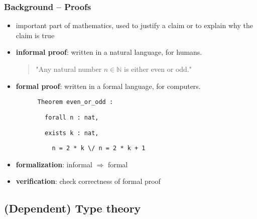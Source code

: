 \documentclass[slides]{beamer}
\begin{document}
\begin{frame}[fragile]
    \frametitle{Background – Proofs}

    \begin{itemize}
        \item important part of mathematics, used to justify a claim or to explain why the claim is true
        \item
            \textbf{informal proof}: written in a natural language, for humans.
            \begin{quote}
              "Any natural number $n \in \mathbb{N}$ is either even or odd."
            \end{quote}

        \item
            \textbf{formal proof}: written in a formal language, for computers.
            \begin{minipage}{\linewidth}\lstinline{      Theorem even_or_odd :}\end{minipage}
            \begin{minipage}{\linewidth}\lstinline{        forall n : nat,}\end{minipage}
            \begin{minipage}{\linewidth}\lstinline{        exists k : nat,}\end{minipage}
            \begin{minipage}{\linewidth}\lstinline{          n = 2 * k \/ n = 2 * k + 1}\end{minipage}
        \item
            \textbf{formalization}: informal $\Rightarrow$ formal
        \item
            \textbf{verification}: check correctness of formal proof

    \end{itemize}
\end{frame}

\subsection{(Dependent) Type theory}
\end{document}
